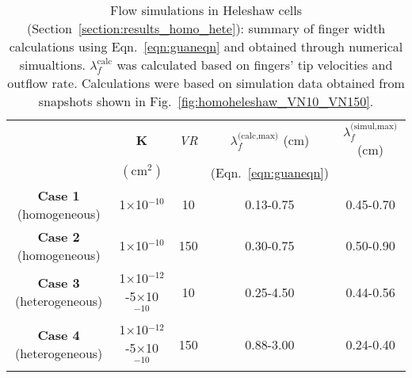 \begin{landscape}
\begin{table}
  \begin{tabular}{c | c c c c}
    \hline\hline
                                  & {\bf K}                                  & {\it VR}  & $\lambda_{f}^{\text{(calc,max)}}$ (cm) & $\lambda_{f}^{\text{(simul,max)}}$ (cm) \\
                                  & $\left(\text{cm}^{2}\right)$              &           &  (Eqn.~\ref{eqn:guaneqn})  &                    \\
    \hline\hline
    {\bf Case 1} (homogeneous)    &  1$\times$10$^{-10}$                      &    10      &  0.13-0.75                 &   0.45-0.70       \\
    {\bf Case 2} (homogeneous)    &  1$\times$10$^{-10}$                      &    150     &  0.30-0.75                 &   0.50-0.90       \\
    {\bf Case 3} (heterogeneous)  &  1$\times$10$^{-12}$-5$\times$10$^{-10}$   &    10      &  0.25-4.50                 &   0.44-0.56       \\
    {\bf Case 4} (heterogeneous)  &  1$\times$10$^{-12}$-5$\times$10$^{-10}$   &    150     &  0.88-3.00                 &   0.24-0.40       
  \end{tabular}
   \caption{Flow simulations in Heleshaw cells (Section~\ref{section:results_homo_hete}): summary of finger width calculations using Eqn.~\ref{eqn:guaneqn} and obtained through numerical simualtions. $\lambda_{f}^{\text{calc}}$ was calculated based on fingers' tip velocities and outflow rate. Calculations were based on simulation data obtained from snapshots shown in Fig.~\ref{fig:homoheleshaw_VN10_VN150}.}\label{table:Heleshaw}
\end{table}
\end{landscape}
\clearpage
